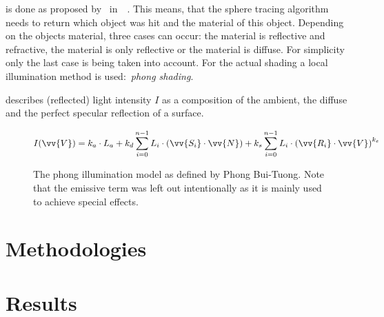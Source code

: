 \documentclass[%
    a4paper,    %
    justified,  %
    nobib,      %
    openany     %
]{tufte-book}
\begin{document}
 is done as proposed by~\citeauthor{whitted_improved_1980}
in~~\cite{whitted_improved_1980}. This means,
that the sphere tracing algorithm needs to return which object was hit and the
material of this object. Depending on the objects material, three cases can
occur: the material is reflective and refractive, the material is only
reflective or the material is diffuse. For simplicity only the last case is
being taken into account. For the actual shading a local illumination method is
used:~\textit{phong shading}.

 describes (reflected) light intensity
$I$ as a composition of the ambient, the diffuse and the perfect specular
reflection of a surface.

\begin{figure}
  \label{eq:phong-equation}
  \caption{The phong illumination model as defined by Phong Bui-Tuong. Note that
  the emissive term was left out intentionally as it is mainly used to achieve
  special effects.}
  \begin{equation}
    I(\vv{V}) = k_{a} \cdot L_{a} + k_{d} \displaystyle\sum_{i=0}^{n - 1} L_{i} \cdot (\vv{S_{i}} \cdot \vv{N}) + k_{s} \displaystyle\sum_{i=0}^{n - 1} L_{i} \cdot {(\vv{R_{i}} \cdot \vv{V})}^{k_{e}}
  \end{equation}
\end{figure}%

\chapter{Methodologies}
\label{chap:methodologies}



\chapter{Results}
\label{chap:results}
\end{document}
